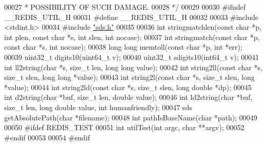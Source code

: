 \begin{DoxyCode}
00027 \textcolor{comment}{ * POSSIBILITY OF SUCH DAMAGE.}
00028 \textcolor{comment}{ */}
00029 
00030 \textcolor{preprocessor}{#}\textcolor{preprocessor}{ifndef} \textcolor{preprocessor}{\_\_REDIS\_UTIL\_H}
00031 \textcolor{preprocessor}{#}\textcolor{preprocessor}{define} \textcolor{preprocessor}{\_\_REDIS\_UTIL\_H}
00032 
00033 \textcolor{preprocessor}{#}\textcolor{preprocessor}{include} \textcolor{preprocessor}{<}\textcolor{preprocessor}{stdint}\textcolor{preprocessor}{.}\textcolor{preprocessor}{h}\textcolor{preprocessor}{>}
00034 \textcolor{preprocessor}{#}\textcolor{preprocessor}{include} \hyperlink{sds_8h}{"sds.h"}
00035 
00036 \textcolor{keywordtype}{int} stringmatchlen(\textcolor{keyword}{const} \textcolor{keywordtype}{char} *p, \textcolor{keywordtype}{int} plen, \textcolor{keyword}{const} \textcolor{keywordtype}{char} *s, \textcolor{keywordtype}{int} slen, \textcolor{keywordtype}{int} nocase);
00037 \textcolor{keywordtype}{int} stringmatch(\textcolor{keyword}{const} \textcolor{keywordtype}{char} *p, \textcolor{keyword}{const} \textcolor{keywordtype}{char} *s, \textcolor{keywordtype}{int} nocase);
00038 \textcolor{keywordtype}{long} \textcolor{keywordtype}{long} memtoll(\textcolor{keyword}{const} \textcolor{keywordtype}{char} *p, \textcolor{keywordtype}{int} *err);
00039 uint32\_t digits10(uint64\_t v);
00040 uint32\_t sdigits10(int64\_t v);
00041 \textcolor{keywordtype}{int} ll2string(\textcolor{keywordtype}{char} *s, size\_t len, \textcolor{keywordtype}{long} \textcolor{keywordtype}{long} value);
00042 \textcolor{keywordtype}{int} string2ll(\textcolor{keyword}{const} \textcolor{keywordtype}{char} *s, size\_t slen, \textcolor{keywordtype}{long} \textcolor{keywordtype}{long} *value);
00043 \textcolor{keywordtype}{int} string2l(\textcolor{keyword}{const} \textcolor{keywordtype}{char} *s, size\_t slen, \textcolor{keywordtype}{long} *value);
00044 \textcolor{keywordtype}{int} string2ld(\textcolor{keyword}{const} \textcolor{keywordtype}{char} *s, size\_t slen, \textcolor{keywordtype}{long} \textcolor{keywordtype}{double} *dp);
00045 \textcolor{keywordtype}{int} d2string(\textcolor{keywordtype}{char} *buf, size\_t len, \textcolor{keywordtype}{double} value);
00046 \textcolor{keywordtype}{int} ld2string(\textcolor{keywordtype}{char} *buf, size\_t len, \textcolor{keywordtype}{long} \textcolor{keywordtype}{double} value, \textcolor{keywordtype}{int} humanfriendly);
00047 sds getAbsolutePath(\textcolor{keywordtype}{char} *filename);
00048 \textcolor{keywordtype}{int} pathIsBaseName(\textcolor{keywordtype}{char} *path);
00049 
00050 \textcolor{preprocessor}{#}\textcolor{preprocessor}{ifdef} \textcolor{preprocessor}{REDIS\_TEST}
00051 \textcolor{keywordtype}{int} utilTest(\textcolor{keywordtype}{int} argc, \textcolor{keywordtype}{char} **argv);
00052 \textcolor{preprocessor}{#}\textcolor{preprocessor}{endif}
00053 
00054 \textcolor{preprocessor}{#}\textcolor{preprocessor}{endif}
\end{DoxyCode}
